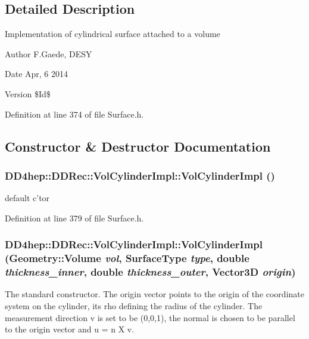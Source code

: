 \subsection{Detailed Description}
Implementation of cylindrical surface attached to a volume \begin{DoxyAuthor}{Author}
F.Gaede, DESY 
\end{DoxyAuthor}
\begin{DoxyDate}{Date}
Apr, 6 2014 
\end{DoxyDate}
\begin{DoxyVersion}{Version}
\$Id\$ 
\end{DoxyVersion}


Definition at line 374 of file Surface.h.

\subsection{Constructor \& Destructor Documentation}
\hypertarget{class_d_d4hep_1_1_d_d_rec_1_1_vol_cylinder_impl_a9a2fc6a4cef827e0636f7591add7f73b}{
\subsubsection[{VolCylinderImpl}]{\setlength{\rightskip}{0pt plus 5cm}DD4hep::DDRec::VolCylinderImpl::VolCylinderImpl ()}}
\label{class_d_d4hep_1_1_d_d_rec_1_1_vol_cylinder_impl_a9a2fc6a4cef827e0636f7591add7f73b}


default c'tor 

Definition at line 379 of file Surface.h.\hypertarget{class_d_d4hep_1_1_d_d_rec_1_1_vol_cylinder_impl_ac5d085d722bab6fe924dcd0bc58d0874}{
\subsubsection[{VolCylinderImpl}]{\setlength{\rightskip}{0pt plus 5cm}DD4hep::DDRec::VolCylinderImpl::VolCylinderImpl ({\bf Geometry::Volume} {\em vol}, \/  {\bf SurfaceType} {\em type}, \/  double {\em thickness\_\-inner}, \/  double {\em thickness\_\-outer}, \/  {\bf Vector3D} {\em origin})}}
\label{class_d_d4hep_1_1_d_d_rec_1_1_vol_cylinder_impl_ac5d085d722bab6fe924dcd0bc58d0874}
The standard constructor. The origin vector points to the origin of the coordinate system on the cylinder, its rho defining the radius of the cylinder. The measurement direction v is set to be (0,0,1), the normal is chosen to be parallel to the origin vector and u = n X v. 

